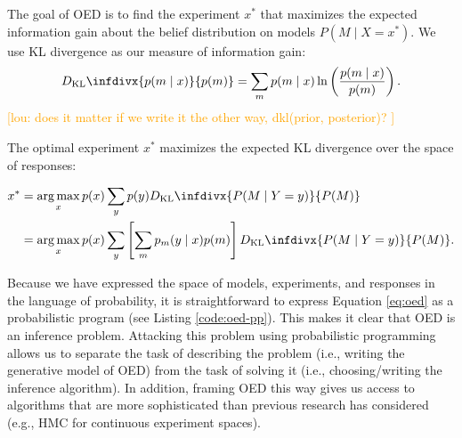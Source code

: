 \documentclass{article}
\newcommand{\dkl}{D_\mathrm{KL}\infdivx}
\newcommand{\lou}[1]{\textcolor{orange}{[lou: #1]}}
\DeclareMathOperator*{\argmax}{arg\,max}
\begin{document}
The goal of OED is to find the experiment $x^{*}$ that maximizes the expected information gain about the belief distribution on models $P(M \mid X = x^{*})$.
We use KL divergence as our measure of information gain:
\begin{align}
  \dkl{ p(m \mid x) }{ p(m) }  = \sum\limits_m p(m \mid x) \ln \left( \frac{p(m \mid x)}{p(m)}\right). \label{eq:kl}
\end{align}
\lou{does it matter if we write it the other way, dkl(prior, posterior)? }

The optimal experiment $x^*$ maximizes the expected KL divergence over the space of responses:

\begin{align}
x^{*} &= \argmax_{x} p(x) \sum\limits_{y} p(y) \dkl{ P(M \mid Y = y) }{ P(M) } \notag \\
    &= \argmax_{x} p(x) \sum\limits_{y} \left[\sum\limits_{m} p_m(y \mid x)p(m)\right] \dkl{P(M \mid Y = y)}{P(M)}. \label{eq:oed}
\end{align}

Because we have expressed the space of models, experiments, and responses in the language of probability, it is straightforward to express Equation \ref{eq:oed} as a probabilistic program (see Listing \ref{code:oed-pp}).
This makes it clear that OED is an inference problem.
Attacking this problem using probabilistic programming allows us to separate the task of describing the problem (i.e., writing the generative model of OED) from the task of solving it (i.e., choosing/writing the inference algorithm).
In addition, framing OED this way gives us access to algorithms that are more sophisticated than previous research has considered  (e.g., HMC for continuous experiment spaces).
\end{document}
